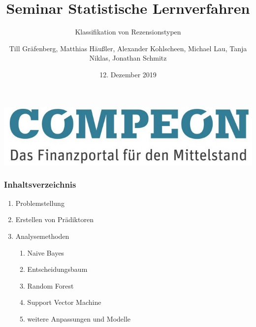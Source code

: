 \documentclass{beamer}
\title{Seminar Statistische Lernverfahren}
\subtitle{Klassifikation von Rezensionstypen}
\author[T.G., M.H., A.K., M.L., T.N., J.S.]{Till Gräfenberg, Matthias Häußler, Alexander Kohlscheen, Michael Lau, Tanja Niklas, Jonathan Schmitz}
\date{12. Dezember 2019}
\begin{document}
\begin{frame}
\thispagestyle{empty}
\begin{flushright}
\includegraphics[scale=0.2]{compeon.png}
\end{flushright}
\titlepage
\end{frame}
\begin{frame}
\addtocounter{framenumber}{-1}
\frametitle{Inhaltsverzeichnis}
\begin{enumerate}\itemsep10pt
\item Problemstellung
\item Erstellen von Prädiktoren
\item Analysemethoden
	\begin{enumerate}
	\item Naive Bayes
	\item Entscheidungsbaum
	\item Random Forest
	\item Support Vector Machine
	\item weitere Anpassungen und Modelle
	\end{enumerate}
\end{enumerate}
\end{frame}
\end{document}
